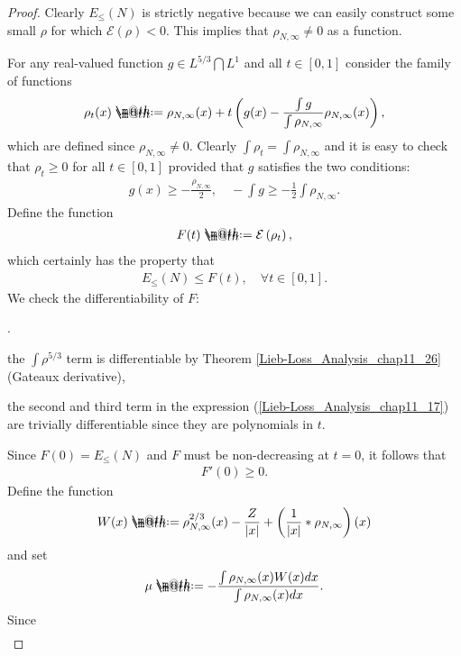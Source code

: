 \documentclass[openany, a4paper, oneside]{jsbook}
\makeatletter
\newcounter{enum2}
\renewenvironment{enumerate}{%
\begin{list}%
{%
\arabic{enum2}.\ \,%
}%
{%
\usecounter{enum2}
\setlength{\itemindent}{0pt}%
\setlength{\leftmargin}{15pt}%
\setlength{\rightmargin}{0pt}%
\setlength{\labelsep}{0pt}%
\setlength{\labelwidth}{6pt}%
\setlength{\itemsep}{0pt}%
\setlength{\parsep}{0pt}%
\setlength{\listparindent}{0pt}%
}
}{%
\end{list}%
}
\newcommand*{\defeq}{\mathrel{\rlap{%
\raisebox{0.3ex}{$\m@th\cdot$}}%
\raisebox{-0.3ex}{$\m@th\cdot$}}%
=}
\theoremstyle{break}
\theoremstyle{breakdefn}
\newcommand{\abs}[1]{\left|#1\right|}
\newcommand{\rbk}[1]{\left (#1\right)}
\newcommand{\sqbk}[1]{\left[#1\right]}
\newcommand{\calE}{\mathcal{E}}
\newcommand{\EleqN}{E_{\leq}(N)}
\newcommand{\rhoNinfty}{\rho_{N, \infty}}
\makeatother
\begin{document}
\begin{proof}
Clearly $\EleqN$ is strictly negative because we can easily construct some small $\rho$ for which $\calE (\rho) < 0$.
This implies that $\rhoNinfty \neq 0$ as a function.

For any real-valued function $g \in L^{5/3} \bigcap L^1$ and all $t \in [0, 1]$ consider the family of functions
\begin{align}
 \rho_t (x)
 \defeq
 \rhoNinfty (x) + t \rbk{ g (x) - \frac{\int g}{\int \rhoNinfty} \rhoNinfty (x)},
\end{align}
which are defined since $\rhoNinfty \neq 0$.
Clearly $\int \rho_t = \int \rhoNinfty$ and it is easy to check that $\rho_t \geq 0$ for all $t \in \sqbk{0, 1}$
provided that $g$ satisfies the two conditions:
\begin{align}
 g (x) \geq - \frac{\rhoNinfty}{2}, \quad
 -\int g \geq - \frac{1}{2} \int \rhoNinfty.
\end{align}
Define the function
\begin{align}
 F (t)
 \defeq
 \calE \rbk{\rho_t},
\end{align}
which certainly has the property that
\begin{align}
 \EleqN
 \leq
 F (t),
 \quad \forall t \in \sqbk{0, 1}. \label{Lieb-Loss_Analysis_chap11_27}
\end{align}
We check the differentiability of $F$:
\begin{enumerate}
\item the $\int \rho^{5/3}$ term is differentiable by Theorem \ref{Lieb-Loss_Analysis_chap11_26} (Gateaux derivative),
\item the second and third term in the expression (\ref{Lieb-Loss_Analysis_chap11_17}) are trivially differentiable
   since they are polynomials in $t$.
\end{enumerate}
Since $F (0) = \EleqN$ and $F$ must be non-decreasing at $t=0$, it follows that
\begin{align}
 F'(0)
 \geq 0.
\end{align}
Define the function
\begin{align}
 W (x)
 \defeq
 \rhoNinfty^{2/3}(x) - \frac{Z}{\abs{x}} + \rbk{\frac{1}{\abs{x}} * \rhoNinfty} (x)
\end{align}
and set
\begin{align}
 \mu
 \defeq
 -\frac{\int \rhoNinfty (x) W (x) dx}{\int \rhoNinfty (x) dx}. \label{Lieb-Loss_Analysis_chap11_30}
\end{align}
Since
\begin{align}

\end{align}
\end{proof}
\end{document}

